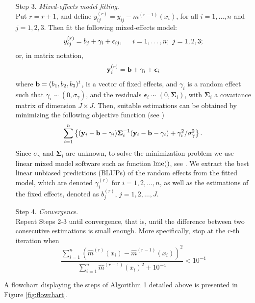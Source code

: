 \documentclass[sn-mathphys]{sn-jnl}%
\theoremstyle{thmstyleone}%
\theoremstyle{thmstyletwo}%
\theoremstyle{thmstylethree}%
\begin{document}
\begin{enumerate}
\item[Step 3.] \textit{Mixed-effects model fitting}. \\
\noindent Put $r=r+1$, and define $y_{ij}^{(r)}=y_{ij}-{m}^{(r-1)}(x_i)$, for all $i=1, \ldots, n$ and $j=1,2,3$. 
Then fit the following mixed-effects model:
\[
y_{ij}^{(r)}= b_j +\gamma_i + \epsilon_{ij}, \hspace{0.5cm} i=1, \ldots, n; \ j=1,2,3;
\]
or, in matrix notation,
\[
{\bf y}_{i}^{(r)} = {\bf b} +\gamma_i + {\boldsymbol \epsilon}_i
\]
where ${\bf b}=(b_1,b_2,b_3)^t$, is a vector of fixed effects, and $\gamma_i$ is a random effect such that $\gamma_i \sim (0, \sigma_{\gamma})$, and the residuals ${\boldsymbol \epsilon}_{i} \sim (0,{\mathbf \Sigma}_i)$, with ${\mathbf \Sigma}_i$ a covariance matrix of dimension $J \times J$. Then, suitable estimations can be obtained by minimizing the following objective function (see \cite{DG2003})
\[
\sum_{i=1}^n \left\{ ({\bf y}_i-{\bf b}-\gamma_i) {\mathbf \Sigma}_i^{-1}({\bf y}_i-{\bf b}-\gamma_i)+ \gamma_i^2/\sigma_{\gamma}^2\right\}.
\]
Since $\sigma_{\gamma}$ and ${\mathbf \Sigma}_{i}$ are unknown, to solve the minimization problem we use linear mixed model software such as function ${\rm lme} ()$, see \cite{PB2000}. We extract the 
 best linear unbiased predictions (BLUPs) of the random effects from the fitted model, which are denoted $\gamma_{i}^{(r)}$ for $i=1, 2, \ldots, n$, as well as the estimations of the fixed effects, denoted as $b_{j}^{(r)}$, $j=1,2,\ldots, J$. 

\item[Step 4.] \textit{Convergence}. \\
\noindent Repeat Steps 2-3 until convergence, that is, until the difference between two consecutive estimations is small enough. More specifically, stop at the $r$-th iteration when
{\small{
\[
\frac{\displaystyle{\sum_{i=1}^n} \left(\widehat{m}^{(r)}(x_i)-\widehat{m}^{(r-1)}(x_i)\right)^2}{\displaystyle{\sum_{i=1}^n}\widehat{m}^{(r-1)}(x_i)^2+10^{-4}}<10^{-4}
\]
}}
\end{enumerate}
A flowchart displaying the steps of Algorithm 1 detailed above is presented in Figure \ref{fig:flowchart}.

\end{document}
